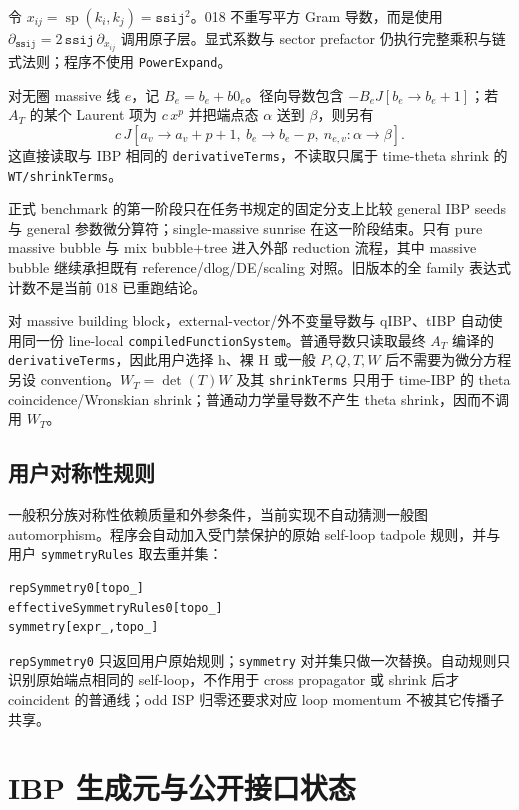 ﻿\documentclass[a4paper,11pt]{article}
\begin{document}
令 $x_{ij}=\operatorname{sp}(k_i,k_j)=\texttt{ssij}^2$。018 不重写平方 Gram 导数，而是使用 $\partial_{\texttt{ssij}}=2\,\texttt{ssij}\,\partial_{x_{ij}}$ 调用原子层。显式系数与 sector prefactor 仍执行完整乘积与链式法则；程序不使用 \texttt{PowerExpand}。

对无圈 massive 线 $e$，记 $B_e=b_e+b0_e$。径向导数包含 $-B_eJ[b_e\to b_e+1]$；若 $A_T$ 的某个 Laurent 项为 $c\,x^p$ 并把端点态 $\alpha$ 送到 $\beta$，则另有
\begin{equation}
 c\,J[a_v\to a_v+p+1,\ b_e\to b_e-p,\ n_{e,v}:\alpha\to\beta].
\end{equation}
这直接读取与 IBP 相同的 \texttt{derivativeTerms}，不读取只属于 time-theta shrink 的 \texttt{WT/shrinkTerms}。

正式 benchmark 的第一阶段只在任务书规定的固定分支上比较 general IBP seeds 与 general 参数微分算符；single-massive sunrise 在这一阶段结束。只有 pure massive bubble 与 mix bubble+tree 进入外部 reduction 流程，其中 massive bubble 继续承担既有 reference/dlog/DE/scaling 对照。旧版本的全 family 表达式计数不是当前 018 已重跑结论。

对 massive building block，external-vector/外不变量导数与 qIBP、tIBP 自动使用同一份 line-local \texttt{compiledFunctionSystem}。普通导数只读取最终 $A_T$ 编译的 \texttt{derivativeTerms}，因此用户选择 h、裸 H 或一般 $P,Q,T,W$ 后不需要为微分方程另设 convention。$W_T=\det(T)W$ 及其 \texttt{shrinkTerms} 只用于 time-IBP 的 theta coincidence/Wronskian shrink；普通动力学量导数不产生 theta shrink，因而不调用 $W_T$。

\subsection{用户对称性规则}

一般积分族对称性依赖质量和外参条件，当前实现不自动猜测一般图 automorphism。程序会自动加入受门禁保护的原始 self-loop tadpole 规则，并与用户 \texttt{symmetryRules} 取去重并集：
\begin{verbatim}
repSymmetry0[topo_]
effectiveSymmetryRules0[topo_]
symmetry[expr_,topo_]
\end{verbatim}
\texttt{repSymmetry0} 只返回用户原始规则；\texttt{symmetry} 对并集只做一次替换。自动规则只识别原始端点相同的 self-loop，不作用于 cross propagator 或 shrink 后才 coincident 的普通线；odd ISP 归零还要求对应 loop momentum 不被其它传播子共享。

\section{IBP 生成元与公开接口状态}
\end{document}

